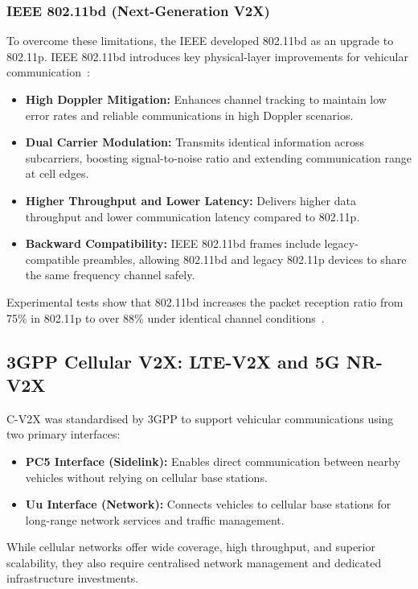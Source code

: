 \subsubsection{IEEE 802.11bd (Next-Generation V2X)}
To overcome these limitations, the IEEE developed 802.11bd as an upgrade to 802.11p.
IEEE 802.11bd introduces key physical-layer improvements for vehicular communication~\cite{anwar2019physical}:
\begin{itemize}
    \item \textbf{High Doppler Mitigation:} Enhances channel tracking to maintain low error rates and reliable communications in high Doppler scenarios.
    \item \textbf{Dual Carrier Modulation:} Transmits identical information across subcarriers, boosting signal-to-noise ratio and extending communication range at cell edges.
    \item \textbf{Higher Throughput and Lower Latency:} Delivers higher data throughput and lower communication latency compared to 802.11p.
    \item \textbf{Backward Compatibility:} IEEE 802.11bd frames include legacy-compatible preambles, allowing 802.11bd and legacy 802.11p devices to share the same frequency channel safely.
\end{itemize}
Experimental tests show that 802.11bd increases the packet reception ratio from 75\% in 802.11p to over 88\% under identical channel conditions~\cite{yacheur2020analysis}.

\subsection{3GPP Cellular V2X: LTE-V2X and 5G NR-V2X}
\label{subsec:cv2x_standards}

C-V2X was standardised by 3GPP to support vehicular communications using two primary interfaces:
\begin{itemize}
    \item \textbf{PC5 Interface (Sidelink):} Enables direct communication between nearby vehicles without relying on cellular base stations.
    \item \textbf{Uu Interface (Network):} Connects vehicles to cellular base stations for long-range network services and traffic management.
\end{itemize}
While cellular networks offer wide coverage, high throughput, and superior scalability, they also require centralised network management and dedicated infrastructure investments.

